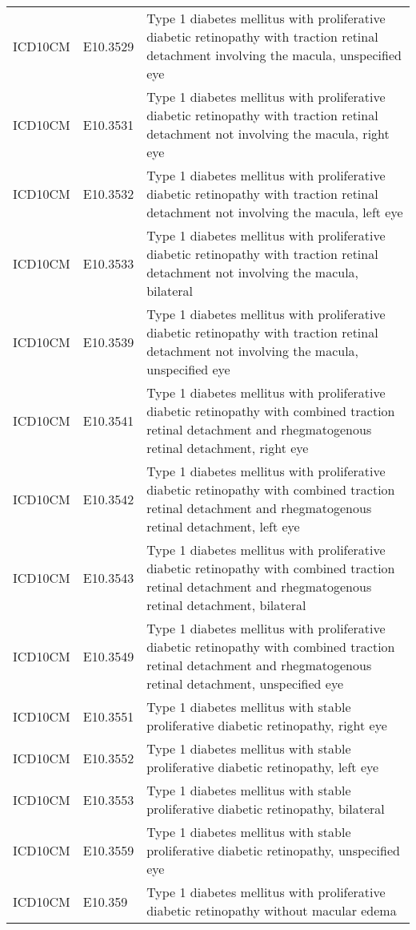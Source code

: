 \begin{longtable}{p{}p{}p{}}
  ICD10CM & E10.3529 & Type 1 diabetes mellitus with proliferative diabetic retinopathy with traction retinal detachment involving the macula, unspecified eye \\ 
  ICD10CM & E10.3531 & Type 1 diabetes mellitus with proliferative diabetic retinopathy with traction retinal detachment not involving the macula, right eye \\ 
  ICD10CM & E10.3532 & Type 1 diabetes mellitus with proliferative diabetic retinopathy with traction retinal detachment not involving the macula, left eye \\ 
  ICD10CM & E10.3533 & Type 1 diabetes mellitus with proliferative diabetic retinopathy with traction retinal detachment not involving the macula, bilateral \\ 
  ICD10CM & E10.3539 & Type 1 diabetes mellitus with proliferative diabetic retinopathy with traction retinal detachment not involving the macula, unspecified eye \\ 
  ICD10CM & E10.3541 & Type 1 diabetes mellitus with proliferative diabetic retinopathy with combined traction retinal detachment and rhegmatogenous retinal detachment, right eye \\ 
  ICD10CM & E10.3542 & Type 1 diabetes mellitus with proliferative diabetic retinopathy with combined traction retinal detachment and rhegmatogenous retinal detachment, left eye \\ 
  ICD10CM & E10.3543 & Type 1 diabetes mellitus with proliferative diabetic retinopathy with combined traction retinal detachment and rhegmatogenous retinal detachment, bilateral \\ 
  ICD10CM & E10.3549 & Type 1 diabetes mellitus with proliferative diabetic retinopathy with combined traction retinal detachment and rhegmatogenous retinal detachment, unspecified eye \\ 
  ICD10CM & E10.3551 & Type 1 diabetes mellitus with stable proliferative diabetic retinopathy, right eye \\ 
  ICD10CM & E10.3552 & Type 1 diabetes mellitus with stable proliferative diabetic retinopathy, left eye \\ 
  ICD10CM & E10.3553 & Type 1 diabetes mellitus with stable proliferative diabetic retinopathy, bilateral \\ 
  ICD10CM & E10.3559 & Type 1 diabetes mellitus with stable proliferative diabetic retinopathy, unspecified eye \\ 
  ICD10CM & E10.359 & Type 1 diabetes mellitus with proliferative diabetic retinopathy without macular edema \\ 

\end{longtable}
